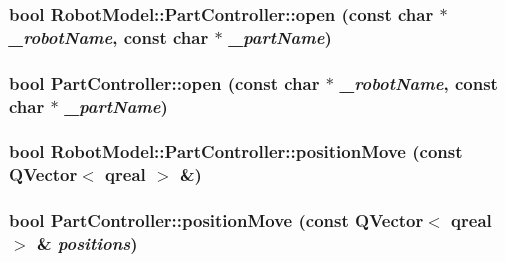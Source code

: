 \label{class_robot_model_1_1_part_controller_a02d325bdc7bd18023e47f97894a2de49}
\hypertarget{class_robot_model_1_1_part_controller_ad7344d850243e282749bd9fa5f84df5c}{
\subsubsection[{open}]{\setlength{\rightskip}{0pt plus 5cm}bool RobotModel::PartController::open (const char $\ast$ {\em \_\-robotName}, \/  const char $\ast$ {\em \_\-partName})}}
\label{class_robot_model_1_1_part_controller_ad7344d850243e282749bd9fa5f84df5c}
\hypertarget{class_robot_model_1_1_part_controller_a20331379a94c33ef330792e6b9e8b94f}{
\subsubsection[{open}]{\setlength{\rightskip}{0pt plus 5cm}bool PartController::open (const char $\ast$ {\em \_\-robotName}, \/  const char $\ast$ {\em \_\-partName})}}
\label{class_robot_model_1_1_part_controller_a20331379a94c33ef330792e6b9e8b94f}
\hypertarget{class_robot_model_1_1_part_controller_a9ab9fab080b18fa2fe162ccedb928460}{
\subsubsection[{positionMove}]{\setlength{\rightskip}{0pt plus 5cm}bool RobotModel::PartController::positionMove (const QVector$<$ qreal $>$ \&)}}
\label{class_robot_model_1_1_part_controller_a9ab9fab080b18fa2fe162ccedb928460}
\hypertarget{class_robot_model_1_1_part_controller_aeb2bca8add9b083ebd19d0d2d07fdfd4}{
\subsubsection[{positionMove}]{\setlength{\rightskip}{0pt plus 5cm}bool PartController::positionMove (const QVector$<$ qreal $>$ \& {\em positions})}}
